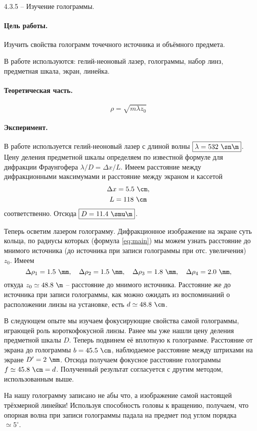 \documentclass{../lab_class}
\begin{document}
{\Large 4.3.5 -- Изучение голограммы.}

\paragraph{Цель работы.}
Изучить свойства голограмм точечного источника и объёмного предмета.

В работе используются: гелий-неоновый лазер, голограммы, набор линз, предметная шкала, экран, линейка.

\paragraph{Теоретическая часть.}

\begin{equation}\label{eq:main}
	\rho = \sqrt{m \lambda z_0}
\end{equation}

\paragraph{Эксперимент.}

В работе используется гелий-неоновый лазер с длиной волны $\boxed{\lambda = 532 \ \sn \m}$. Цену деления предметной шкалы определяем по известной формуле для дифракции Фраунгофера $\lambda/D = \Delta x / L$. Имеем расстояние между дифракционными максимумами и расстояние между экраном и кассетой
\begin{gather*}
	\Delta x = 5.5 \ \cm, \\
	L = 118 \ \cm
\end{gather*}
соответственно. Отсюда $\boxed{D = 11.4 \ \smu \m}$.

Теперь осветим лазером голограмму. Дифракционное изображение на экране суть кольца, по радиусы которых (формула \ref{eq:main}) мы можем узнать расстояние до мнимого источника (до источника при записи голограммы при отс. увеличения) $z_0$. Имеем
\begin{equation*}
	\Delta\rho_1 = 1.5 \ \mm, \quad \Delta\rho_2 = 1.5 \ \mm, \quad \Delta\rho_3 = 1.8 \ \mm, \quad \Delta\rho_4 = 2.0 \ \mm,
\end{equation*}
откуда $z_0 \simeq 48.8 \ \m$ -- расстояние до мнимого источника. Расстояние же до источника при записи голограммы, как можно ожидать из воспоминаний о расположении линзы на установке, есть $d \simeq 48.8 \ \cm$.

В следующем опыте мы изучаем фокусирующие свойства самой голограммы, играющей роль короткофокусной линзы. Ранее мы уже нашли цену деления предметной шкалы $D$. Теперь подвинем её вплотную к голограмме. Расстояние от экрана до голограммы $b = 45.5 \ \cm$, наблюдаемое расстояние между штрихами на экране $D' = 2 \ \mm$. Отсюда получаем фокусное расстояние голограммы $f \simeq 45.8 \ \cm = d$. Полученный результат согласуется с другим методом, использованным выше. 

На нашу голограмму записано не абы что, а изображение самой настоящей трёхмерной линейки! Используя способность головы к вращению, получаем, что опорная волна при записи голограммы падала на предмет под углом порядка $\simeq 5^{\circ}$.
\end{document}
